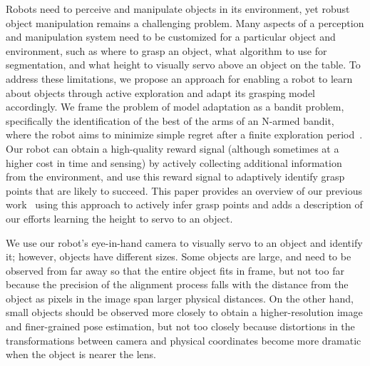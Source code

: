 \documentclass[conference,onecolumn]{IEEEtran}
\begin{document}




%
\IEEEpeerreviewmaketitle


Robots need to perceive and manipulate objects in its environment, yet
robust object manipulation remains a challenging problem.  Many
aspects of a perception and manipulation system need to be customized
for a particular object and environment, such as where to grasp an
object, what algorithm to use for segmentation, and what height to
visually servo above an object on the table.  To address these
limitations, we propose an approach for enabling a robot to learn
about objects through active exploration and adapt its grasping model
accordingly.  We frame the problem of model adaptation as a bandit
problem, specifically the identification of the best of the arms of an
N-armed bandit, ~\citep{thompson33} where the robot aims to minimize
simple regret after a finite exploration period~\citep{bubeck09}.  Our
robot can obtain a high-quality reward signal (although sometimes at a
higher cost in time and sensing) by actively collecting additional
information from the environment, and use this reward signal to
adaptively identify grasp points that are likely to succeed.  This
paper provides an overview of our previous work~\citep{oberlin15}
using this approach to actively infer grasp points and adds a
description of our efforts learning the height to servo to an object.

We use our robot's eye-in-hand camera to visually servo to an object
and identify it; however, objects have different sizes. Some objects
are large, and need to be observed from far away so that the entire
object fits in frame, but not too far because the precision of the
alignment process falls with the distance from the object as pixels in
the image span larger physical distances.  On the other hand, small
objects should be observed more closely to obtain a higher-resolution
image and finer-grained pose estimation, but not too closely because
distortions in the transformations between camera and physical
coordinates become more dramatic when the object is nearer the lens.
\end{document}
